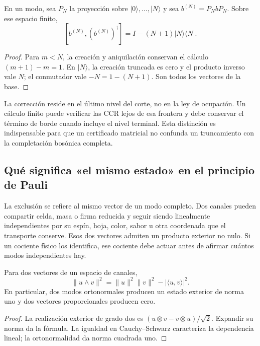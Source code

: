 \begin{proposition}
\label{vi:prop:corte-bosonico}
En un modo, sea \(P_N\) la proyección sobre
\(|0\rangle,\ldots,|N\rangle\) y sea \(b^{(N)}=P_NbP_N\).
Sobre ese espacio finito,
\[
 [b^{(N)},(b^{(N)})^\dagger]
 =I-(N+1)|N\rangle\langle N|.
\]
\end{proposition}
\begin{proof}
Para \(m<N\), la creación y aniquilación conservan el cálculo
\((m+1)-m=1\). En \(|N\rangle\), la creación truncada es
cero y el producto inverso vale \(N\); el conmutador vale
\(-N=1-(N+1)\). Son todos los vectores de la base.
\end{proof}

La corrección reside en el último nivel del corte, no en la ley de
ocupación. Un cálculo finito puede verificar las CCR lejos de esa
frontera y debe conservar el término de borde cuando incluye el
nivel terminal. Esta distinción es indispensable para que un
certificado matricial no confunda un truncamiento con la
completación bosónica completa.

\subsection{Qué significa «el mismo estado» en el principio de Pauli}
\label{vi:subsec:pauli-etiquetas-hojas}

La exclusión se refiere al mismo vector de un modo completo. Dos
canales pueden compartir celda, masa o firma reducida y seguir
siendo linealmente independientes por su espín, hoja, color,
sabor u otra coordenada que el transporte conserve. Esos dos
vectores admiten un producto exterior no nulo. Si un cociente
físico los identifica, ese cociente debe actuar antes de afirmar
cuántos modos independientes hay.

\begin{proposition}
\label{vi:prop:pauli-gram}
Para dos vectores de un espacio de canales,
\[
 \|u\wedge v\|^2
 =\|u\|^2\|v\|^2-|\langle u,v\rangle|^2.
\]
En particular, dos modos ortonormales producen un estado exterior
de norma uno y dos vectores proporcionales producen cero.
\end{proposition}
\begin{proof}
La realización exterior de grado dos es
\((u\otimes v-v\otimes u)/\sqrt2\). Expandir su norma da
la fórmula. La igualdad en Cauchy--Schwarz caracteriza la
dependencia lineal; la ortonormalidad da norma cuadrada uno.
\end{proof}

